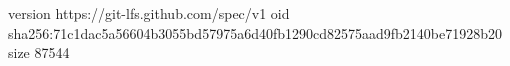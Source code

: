 version https://git-lfs.github.com/spec/v1
oid sha256:71c1dac5a56604b3055bd57975a6d40fb1290cd82575aad9fb2140be71928b20
size 87544
